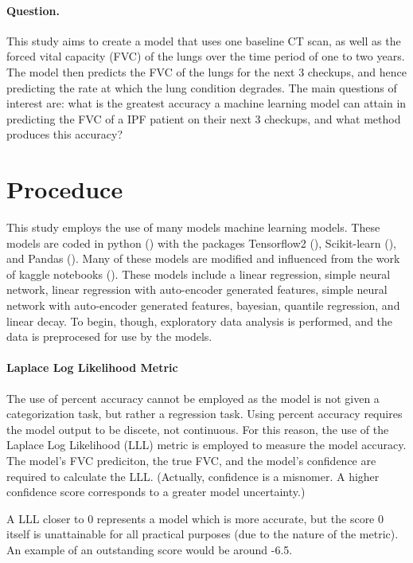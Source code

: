 \documentclass[12pt]{article}
\begin{document}
\paragraph*{Question.}

This study aims to create a model that uses one baseline CT scan, as well as the forced vital capacity (FVC) of the lungs over the time period of one to two years.
The model then predicts the FVC of the lungs for the next 3 checkups, and hence predicting the rate at which the lung condition degrades. 
The main questions of interest are: what is the greatest accuracy a machine learning model can attain in predicting the FVC of a IPF patient on their next 3 checkups, and what method produces this accuracy? 

\section{Proceduce}

This study employs the use of many models machine learning models.
These models are coded in python (\cite{10.5555/1593511}) with the packages Tensorflow2 (\cite{tensorflow2015-whitepaper}), Scikit-learn (\cite{scikit-learn}), and Pandas (\cite{mckinney2010data}).
Many of these models are modified and influenced from the work of kaggle notebooks (\cite{kaggle}).
These models include a linear regression, simple neural network, linear regression with auto-encoder generated features, simple neural network with auto-encoder generated features, bayesian, quantile regression, and linear decay.
To begin, though, exploratory data analysis is performed, and the data is preprocesed for use by the models.

\paragraph*{Laplace Log Likelihood Metric}

The use of percent accuracy cannot be employed as the model is not given a categorization task, but rather a regression task. 
Using percent accuracy requires the model output to be discete, not continuous. 
For this reason, the use of the Laplace Log Likelihood (LLL) metric is employed to measure the model accuracy. 
The model's FVC prediciton, the true FVC, and the model's confidence are required to calculate the LLL. 
(Actually, confidence is a misnomer. A higher confidence score corresponds to a greater model uncertainty.)

A LLL closer to 0 represents a model which is more accurate, but the score 0 itself is unattainable for all practical purposes (due to the nature of the metric). 
An example of an outstanding score would be around -6.5.
\end{document}
